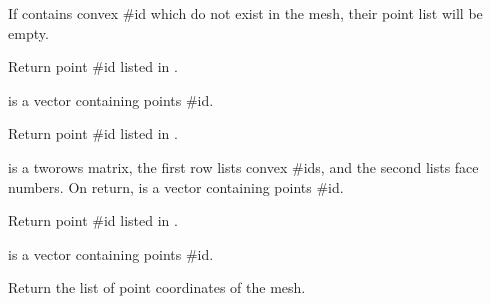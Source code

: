 \documentclass[a4paper,11pt,english]{sphinxmanual}
\begin{document}
\begin{fulllineitems}
\begin{fulllineitems}
If  contains convex \#id which do not exist in the mesh,
their point list will be empty.

\end{fulllineitems}


\begin{fulllineitems}
\label{\detokenize{python/cmdref_Mesh:getfem.Mesh.pid_in_cvids}}
Return point \#id listed in .

 is a vector containing points \#id.

\end{fulllineitems}


\begin{fulllineitems}
\label{\detokenize{python/cmdref_Mesh:getfem.Mesh.pid_in_faces}}
Return point \#id listed in .

 is a two\sphinxhyphen{}rows matrix, the first row lists convex \#ids,
and the second lists face numbers. On return,  is a
vector containing points \#id.

\end{fulllineitems}


\begin{fulllineitems}
\label{\detokenize{python/cmdref_Mesh:getfem.Mesh.pid_in_regions}}
Return point \#id listed in .

 is a vector containing points \#id.

\end{fulllineitems}


\begin{fulllineitems}
\label{\detokenize{python/cmdref_Mesh:getfem.Mesh.pts}}
Return the list of point coordinates of the mesh.


\end{fulllineitems}
\end{fulllineitems}
\end{document}

